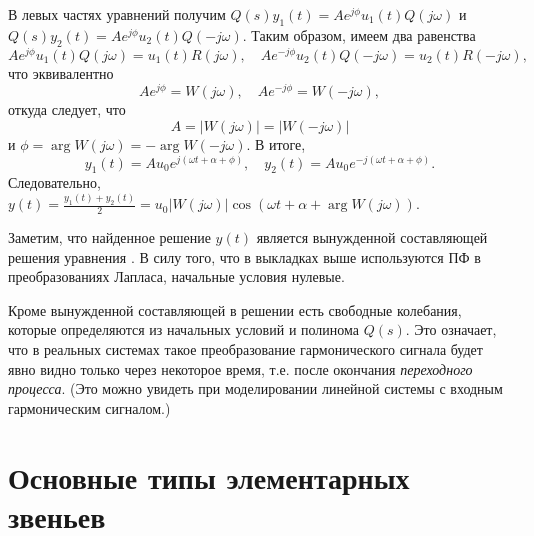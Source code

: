 \documentclass[../../TAU.tex]{subfiles}
\begin{document}
    В левых частях уравнений получим $Q(s)y_1(t) = Ae^{j\phi}u_1(t)Q(j\omega)$ и $Q(s)y_2(t) = Ae^{j\phi}u_2(t)Q(-j\omega)$. Таким образом, имеем два равенства
    $$
        Ae^{j\phi} u_1(t)Q(j\omega) = u_1(t)R(j\omega),\quad Ae^{-j\phi} u_2(t)Q(-j\omega) = u_2(t)R(-j\omega),
    $$
    что эквивалентно
    $$
        Ae^{j\phi} = W(j\omega),\quad Ae^{-j\phi} = W(-j\omega),
    $$
    откуда следует, что 
    $$
        A = |W(j\omega)| = |W(-j\omega)|
    $$ 
    и 
    $\phi = \arg W(j\omega) = -\arg W(-j\omega)$. В итоге,
    $$
        y_1(t) = Au_0e^{j(\omega t + \alpha + \phi)},\quad
        y_2(t) = Au_0e^{-j(\omega t + \alpha + \phi)}.
    $$
    Следовательно, $y(t) = \frac{y_1(t)+y_2(t)}{2} = u_0|W(j\omega)| \cos(\omega t + \alpha + \arg W(j\omega))$.

    Заметим, что найденное решение $y(t)$ является вынужденной составляющей решения уравнения .  В силу того, что в выкладках выше используются ПФ в преобразованиях Лапласа, начальные условия нулевые.

    Кроме вынужденной составляющей в решении есть свободные колебания, которые определяются из начальных условий и полинома $Q(s)$. Это означает, что в реальных системах такое преобразование гармонического сигнала будет явно видно только через некоторое время, т.е. после окончания {\it переходного процесса}. (Это можно увидеть при моделировании линейной системы с входным гармоническим сигналом.)
\section{Основные типы элементарных звеньев} %
\end{document}
